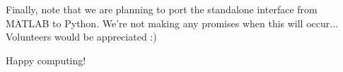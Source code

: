 \documentclass{article}
\begin{document}
Finally, note that we are planning to port the standalone interface from MATLAB to Python. We're not making any promises when this will occur... Volunteers would be appreciated :) 

Happy computing!

\end{document}
